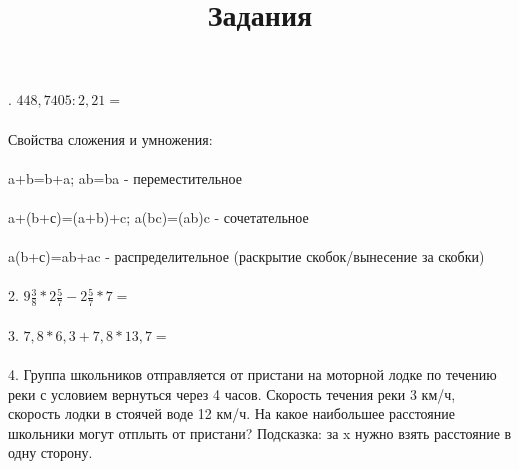 \documentclass[a4paper,70pt]{article}
\title{Задания}
\date{}
\begin{document}
\fontsize{18}{16pt}\selectfont
{}. $448,7405:2,21=$ 
\paragraph{}
Свойства сложения и умножения:
\paragraph{}
a+b=b+a; ab=ba - переместительное
\paragraph{}
a+(b+с)=(a+b)+c; a(bc)=(ab)c - сочетательное
\paragraph{}
a(b+с)=ab+ac - распределительное (раскрытие скобок/вынесение за скобки)
\paragraph{}

2. $9\frac{3}{8}*2\frac{5}{7}-2\frac{5}{7}*7=$
\paragraph{}
3. $7,8*6,3+7,8*13,7=$
\paragraph{}
4. Группа школьников отправляется от пристани на моторной лодке по течению реки с условием вернуться через 4 часов. Скорость течения реки 3 км/ч, скорость лодки в стоячей воде 12 км/ч. На какое наибольшее расстояние школьники могут отплыть от пристани? Подсказка: за x нужно взять расстояние в одну сторону.
\end{document}
